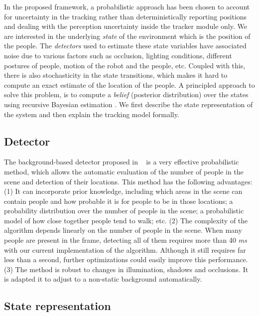 
In the proposed framework, a probabilistic approach has been chosen to account for uncertainty in the tracking rather than deterministically reporting positions and dealing with the perception uncertainty inside the tracker module only. We are interested in the underlying \textit{state} of the environment which is the position of the people. The \textit{detectors} used to estimate these state variables have associated noise due to various factors such as occlusion, lighting conditions, different postures of people, motion of the robot and the people, etc. Coupled with this, there is also stochasticity in the state transitions, which makes it hard to compute an exact estimate of the location of the people. A principled approach to solve this problem, is to compute a \textit{belief} (posterior distribution) over the states using recursive Bayesian estimation%
. We first describe the state representation of the system and then explain the tracking model formally.

\subsection{Detector}
The background-based detector proposed in ~\cite{englebienne-bnaic} is a very effective probabilistic method, which allows the automatic evaluation of the number of people in the scene and detection of their locations. This method has the following advantages: (1) It can incorporate prior knowledge, including which areas in the scene can contain people and how probable it is for people to be in those locations; a probability distribution over the number of people in the scene; a probabilistic model of how close
together people tend to walk; etc. (2) The complexity of the algorithm depends linearly on the number of people in the scene. When many people are present in the frame, detecting all of them requires
more than 40 \textit{ms} with our current implementation of the algorithm. Although it still requires far less than a second, further optimizations could easily improve this performance. (3) The method is robust to changes in illumination, shadows and occlusions. It is adapted it to adjust to a non-static background automatically.

\subsection{State representation}

